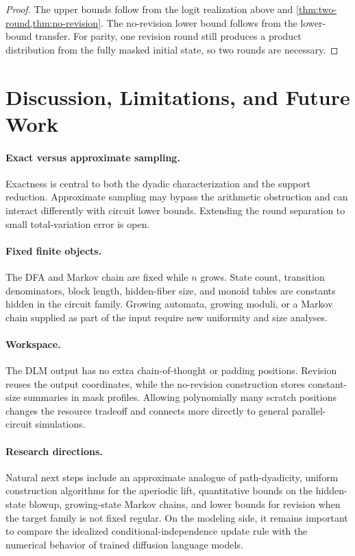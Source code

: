 \documentclass[10pt]{article}
\theoremstyle{definition}
\begin{document}
\begin{proof}
The upper bounds follow from the logit realization above and
\cref{thm:two-round,thm:no-revision}.  The no-revision lower bound follows
from the lower-bound transfer.  For parity, one revision round still produces
a product distribution from the fully masked initial state, so two rounds are
necessary.
\end{proof}

\section{Discussion, Limitations, and Future Work}
\label{sec:discussion}

\paragraph{Exact versus approximate sampling.}
Exactness is central to both the dyadic characterization and the support
reduction.  Approximate sampling may bypass the arithmetic obstruction and can
interact differently with circuit lower bounds.  Extending the round
separation to small total-variation error is open.

\paragraph{Fixed finite objects.}
The DFA and Markov chain are fixed while $n$ grows.  State count, transition
denominators, block length, hidden-fiber size, and monoid tables are constants
hidden in the circuit family.  Growing automata, growing moduli, or a Markov
chain supplied as part of the input require new uniformity and size analyses.

\paragraph{Workspace.}
The DLM output has no extra chain-of-thought or padding positions.  Revision
reuses the output coordinates, while the no-revision construction stores
constant-size summaries in mask profiles.  Allowing polynomially many scratch
positions changes the resource tradeoff and connects more directly to general
parallel-circuit simulations.

\paragraph{Research directions.}
Natural next steps include an approximate analogue of path-dyadicity, uniform
construction algorithms for the aperiodic lift, quantitative bounds on the
hidden-state blowup, growing-state Markov chains, and lower bounds for revision
when the target family is not fixed regular.  On the modeling side, it remains
important to compare the idealized conditional-independence update rule with
the numerical behavior of trained diffusion language models.
\end{document}
